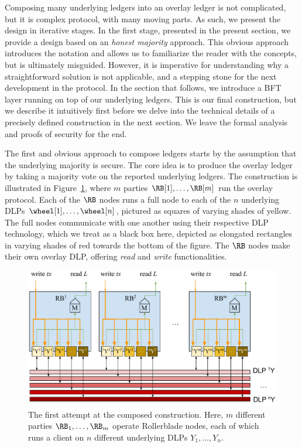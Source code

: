 Composing many underlying ledgers into an overlay ledger is not complicated, but it is complex
protocol, with many moving parts. As such, we present the design in iterative stages. In the
first stage, presented in the present section, we provide a design based on an \emph{honest majority}
approach. This obvious approach introduces the notation and allows us to familiarize the reader
with the concepts, but is ultimately misguided. However, it is imperative for understanding why
a straightforward solution is not applicable, and a stepping stone for the next development in
the protocol. In the section that follows, we introduce a BFT layer running on top of our
underlying ledgers. This is our final construction, but we describe it intuitively first before
we delve into the technical details of a precisely defined construction in the next section.
We leave the formal analysis and proofs of security for the end.

The first and obvious approach to compose ledgers starts by the assumption that the
underlying majority is secure. The core idea is to produce the overlay ledger by taking
a majority vote on the reported underlying ledgers. The construction is illustrated in
Figure~\ref{fig.naive}, where
$m$ parties $\RB[1], \ldots, \RB[m]$ run the overlay protocol.
Each of the $\RB$ nodes runs
a full node to each of the $n$ underlying DLPs $\wheel[1], \ldots, \wheel[n]$, pictured as squares
of varying shades of yellow. The full nodes communicate with one another using their
respective DLP technology, which we treat as a black box here, depicted as elongated
rectangles in varying shades of red towards the bottom of the figure.
The $\RB$ nodes
make their own overlay DLP, offering \emph{read} and \emph{write} functionalities.

\begin{figure}
    \centering
    \includegraphics[width=\textwidth,keepaspectratio]{figures/rollerblade-naive-construction.pdf}
    \caption{The first attempt at the composed construction. Here,
             $m$ different parties $\RB_1, \ldots, \RB_m$ operate Rollerblade
             nodes, each of which runs a client on $n$ different underlying
             DLPs $Y_1, \ldots, Y_n$.}
    \label{fig.naive}
\end{figure}

